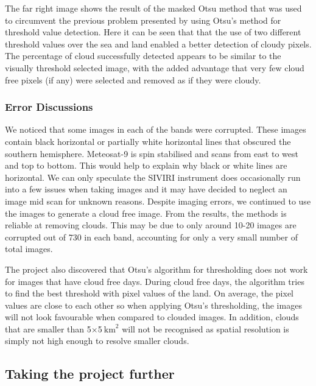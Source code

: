 \par The far right image shows the result of the masked Otsu method that was used to circumvent the previous problem presented by using Otsu's method for threshold value detection. Here it can be seen that that the use of two different threshold values over the sea and land enabled a better detection of cloudy pixels. The percentage of cloud successfully detected appears to be similar to the visually threshold selected image, with the added advantage that very few cloud free pixels (if any) were selected and removed as if they were cloudy.


\subsubsection{Error Discussions}

We noticed that some images in each of the bands were corrupted. These images contain black horizontal or partially white horizontal lines that obscured the southern hemisphere. Meteosat-9 is spin stabilised and scans from east to west and top to bottom. This would help to explain why black or white lines are horizontal. We can only speculate the SIVIRI instrument does occasionally run into a few issues when taking images and it may have decided to neglect an image mid scan for unknown reasons. Despite imaging errors, we continued to use the images to generate a cloud free image. From the results, the  methods is reliable at removing clouds. This may be due to only around 10-20 images are corrupted out of 730 in each band, accounting for only a very small number of total images.
\par
The project also discovered that Otsu's algorithm for thresholding does not work for images that have cloud free days. During cloud free days, the algorithm tries to find the best threshold with pixel values of the land. On average, the pixel values are close to each other so when applying Otsu's thresholding, the images will not look favourable when compared to clouded images. In addition, clouds that are smaller than 5$\times$5$\mathrm{~km}^{2}$ will not be recognised as spatial resolution is simply not high enough to resolve smaller clouds.
\par

\subsection{Taking the project further}

